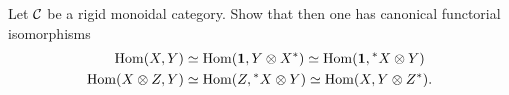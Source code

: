 \begin{exercise}\label{ec:dual-morphism2}
  Let $\mathcal{C}$ be a rigid monoidal category. Show that then one has
  canonical functorial isomorphisms
  \begin{align*}
    \operatorname{Hom}(X,Y)&\simeq \operatorname{Hom}(\mathbf{1}, Y\otimes X^*)\simeq \operatorname{Hom}(\mathbf{1}, {}^*X\otimes Y)\\
    \operatorname{Hom}(X\otimes Z, Y)&\simeq \operatorname{Hom}(Z, {}^*X\otimes Y)\simeq \operatorname{Hom}(X, Y\otimes
    Z^*).
  \end{align*}
\end{exercise}

